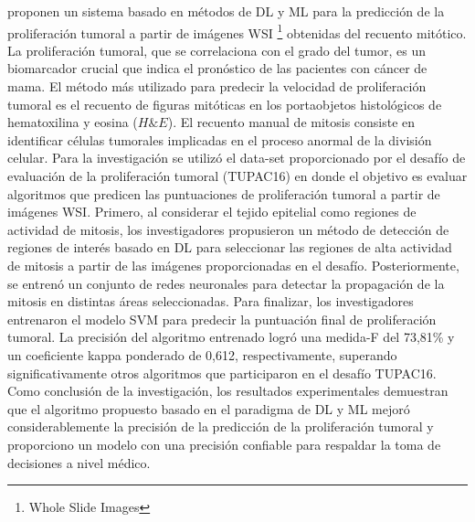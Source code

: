 \cite{Nateghi2021} proponen un sistema basado en métodos de DL y ML para la predicción de la proliferación tumoral a partir de imágenes WSI \footnote{ Whole Slide Images } obtenidas del recuento mitótico. La proliferación tumoral, que se correlaciona con el grado del tumor, es un biomarcador crucial que indica el pronóstico de las pacientes con cáncer de mama. El método más utilizado para predecir la velocidad de proliferación tumoral es el recuento de figuras mitóticas en los portaobjetos histológicos de hematoxilina y eosina ($H\&E$). El recuento manual de mitosis consiste en identificar células tumorales implicadas en el proceso anormal de la división celular. Para la investigación se utilizó el data-set proporcionado por el desafío de evaluación de la proliferación tumoral (TUPAC16) en donde el objetivo es evaluar algoritmos que predicen las puntuaciones de proliferación tumoral a partir de imágenes WSI. Primero, al considerar el tejido epitelial como regiones de actividad de mitosis, los investigadores propusieron un método de detección de regiones de interés basado en DL para seleccionar las regiones de alta actividad de mitosis a partir de las imágenes proporcionadas en el desafío. Posteriormente, se entrenó un conjunto de redes neuronales para detectar la propagación de la mitosis en distintas áreas seleccionadas. Para finalizar, los investigadores entrenaron el modelo SVM para predecir la puntuación final de proliferación tumoral. La precisión del algoritmo entrenado logró una medida-F del 73,81\% y un coeficiente kappa ponderado de 0,612, respectivamente, superando significativamente otros algoritmos que participaron en el desafío TUPAC16. Como conclusión de la investigación, los resultados experimentales demuestran que el algoritmo propuesto basado en el paradigma de DL y ML mejoró considerablemente la precisión de la predicción de la proliferación tumoral y proporciono un modelo con una precisión confiable para respaldar la toma de decisiones a nivel médico.


